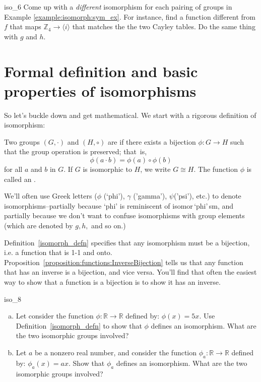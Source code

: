  \begin{exercise}{iso_6}
 Come up with a \emph{different} isomorphism for each pairing of groups in Example \ref{example:isomorph:sym_ex}. For instance, find a  function  different from $f$ that maps ${\mathbb Z_4} \longrightarrow \langle i \rangle$  that matches the the two Cayley tables. Do the same thing with $g$ and $h$.
 \end{exercise}
  
\section{Formal definition and basic properties of isomorphisms}
\label{sec:FormalDefinitionIsomorphism}

So let's buckle down and get mathematical. We start with a rigorous definition of isomorphism:

\begin{defn}\label{isomorph_defn}
Two groups $(G, \cdot)$ and $(H, \circ)$ are  if there exists a bijection $\phi : G \rightarrow H$ such that the group operation is preserved;  that~is, 
\[
\phi( a \cdot b) = \phi( a) \circ \phi( b)
\]
for all $a$ and $b$ in $G$. If $G$ is isomorphic to $H$, we write $G \cong H$. The function $\phi$ is called an . 
\end{defn}

\begin{rem}
We'll often use Greek letters ($\phi$ (`phi'), $\gamma$ ('gamma'), $\psi$('psi'), etc.) to denote isomorphisms--partially because `phi' is reminiscent of isomor$\,$`phi'$\,$sm, and partially because we don't want to confuse isomorphisms with group elements  (which are denoted by $g,h,$ and so on.)
\end{rem}

\begin{rem}
Definition~\ref{isomorph_defn} specifies that any isomorphism must be a bijection, i.e. a function that is 1-1 and onto.  Proposition~\ref{proposition:functions:InverseBijection} tells us that any function that has an inverse is a bijection, and vice versa. You'll find that often the easiest way to show that a function is a bijection is to show it has an inverse.   
\end{rem}


\begin{exercise}{iso_8}
\begin{enumerate}[(a)]
\item
Let consider the function $\phi : \mathbb{R} \rightarrow \mathbb{R}$ defined by:  $\phi(x) = 5x$.  Use Definition~\ref{isomorph_defn} to show that $\phi$ defines an isomorphism. What are the two isomorphic groups involved?
\item
Let $a$ be a nonzero real number, and consider the function $\phi_a : \mathbb{R} \rightarrow \mathbb{R}$ defined by:  $\phi_a(x) = ax$.  Show that $\phi_a$ defines an isomorphism. What are the two isomorphic groups involved?
\end{enumerate}
\end{exercise}

